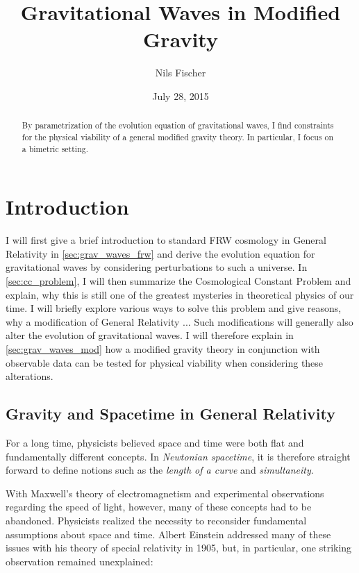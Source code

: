\documentclass[parskip=half]{scrreprt}
\title{Gravitational Waves in Modified Gravity}
\author{Nils Fischer}
\date{July 28, 2015}
\begin{document}
\maketitle

\begin{abstract}
	By parametrization of the evolution equation of gravitational waves, I find constraints for the physical viability of a general modified gravity theory. In particular, I focus on a bimetric setting.
\end{abstract}


\tableofcontents


\chapter{Introduction}

I will first give a brief introduction to standard FRW cosmology in General Relativity in \autoref{sec:grav_waves_frw} and derive the evolution equation for gravitational waves by considering perturbations to such a universe. In \autoref{sec:cc_problem}, I will then summarize the Cosmological Constant Problem and explain, why this is still one of the greatest mysteries in theoretical physics of our time. I will briefly explore various ways to solve this problem and give reasons, why a modification of General Relativity ... Such modifications will generally also alter the evolution of gravitational waves. I will therefore explain in \autoref{sec:grav_waves_mod} how a modified gravity theory in conjunction with observable data can be tested for physical viability when considering these alterations.


\section{Gravity and Spacetime in General Relativity \citep{Tolish}}\label{sec:gr}

For a long time, physicists believed space and time were both flat and fundamentally different concepts. In \emph{Newtonian spacetime}, it is therefore straight forward to define notions such as the \emph{length of a curve} and \emph{simultaneity}.

With Maxwell's theory of electromagnetism and experimental observations regarding the speed of light, however, many of these concepts had to be abandoned. Physicists realized the necessity to reconsider fundamental assumptions about space and time. Albert Einstein addressed many of these issues with his theory of special relativity  in 1905, but, in particular, one striking observation remained unexplained:
\end{document}
